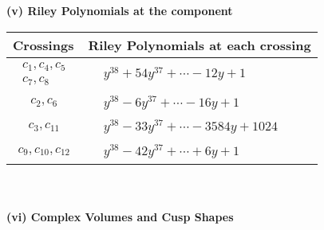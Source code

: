 \documentclass[1p]{elsarticle_modified}
\theoremstyle{definition}
\begin{document}
\newpage\renewcommand{\arraystretch}{1}
\flushleft \textbf{(v) Riley Polynomials at the component}\newline \\
\begin{tabular}{m{50pt}|m{274pt}}
Crossings & \hspace{64pt}Riley Polynomials at each crossing \\
\hline $$\begin{aligned}c_{1},c_{4},c_{5}\\c_{7},c_{8}\end{aligned}$$&$\begin{aligned}
&y^{38}+54 y^{37}+\cdots-12 y+1
\end{aligned}$\\
\hline $$\begin{aligned}c_{2},c_{6}\end{aligned}$$&$\begin{aligned}
&y^{38}-6 y^{37}+\cdots-16 y+1
\end{aligned}$\\
\hline $$\begin{aligned}c_{3},c_{11}\end{aligned}$$&$\begin{aligned}
&y^{38}-33 y^{37}+\cdots-3584 y+1024
\end{aligned}$\\
\hline $$\begin{aligned}c_{9},c_{10},c_{12}\end{aligned}$$&$\begin{aligned}
&y^{38}-42 y^{37}+\cdots+6 y+1
\end{aligned}$\\
\hline
\end{tabular}\\~\\
\newpage\flushleft \textbf{(vi) Complex Volumes and Cusp Shapes}
\end{document}
